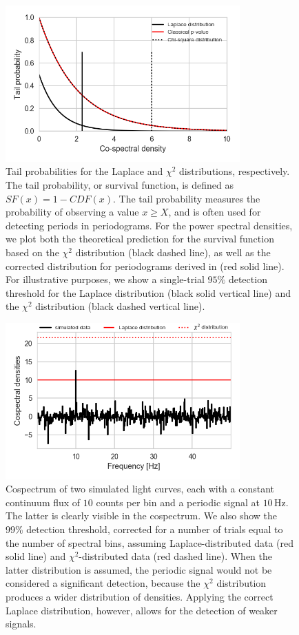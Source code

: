 \documentclass[12pt]{emulateapj}
\begin{document}
\begin{figure}
\begin{center}
\includegraphics[width=9cm]{tailprob.png}
\caption{Tail probabilities for the Laplace and $\chi^2$ distributions, respectively. The tail probability, or survival function, is defined as $SF(x) = 1 - CDF(x)$. The tail probability measures the probability of observing a value $x\geq X$, and is often used for detecting periods in periodograms. For the power spectral densities, we plot both the theoretical prediction for the survival function based on the $\chi^2$ distribution (black dashed line), as well as the corrected distribution for periodograms derived in \citet{groth1975} (red solid line). For illustrative purposes, we show a single-trial $95\%$ detection threshold for the Laplace distribution (black solid vertical line) and the $\chi^2$ distribution (black dashed vertical line).}
\label{fig:survival}
\end{center}
\end{figure}

\begin{figure}
\begin{center}
\includegraphics[width=9cm]{cs_detec.png}
\caption{Cospectrum of two simulated light curves, each with a constant continuum flux of $10$ counts per bin and a periodic signal at $10\,\mathrm{Hz}$. The latter is clearly visible in the cospectrum. We also show the 99\% detection threshold, corrected for a number of trials equal to the number of spectral bins, assuming Laplace-distributed data (red solid line) and $\chi^2$-distributed data (red dashed line). When the latter distribution is assumed, the periodic signal would not be considered a significant detection, because the $\chi^2$ distribution produces a wider distribution of densities. Applying the correct Laplace distribution, however, allows for the detection of weaker signals.}
\label{fig:cs_sim}
\end{center}
\end{figure}
\end{document}
